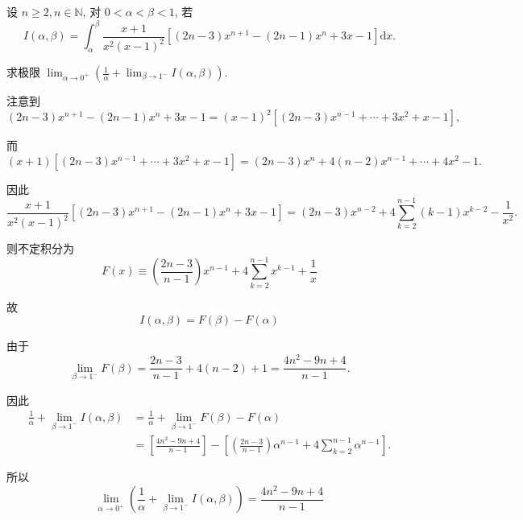 \begin{solution}
    设 $n \geq 2, n \in \mathbb{N}$, 对 $0<\alpha<\beta<1$, 若
    $$
        I(\alpha, \beta)=\int_\alpha^\beta \frac{x+1}{x^2(x-1)^2}\left[(2 n-3) x^{n+1}-(2 n-1) x^n+3 x-1\right] \mathrm{d} x .
    $$

    求极限 $\lim _{\alpha \rightarrow 0^{+}}\left(\frac{1}{\alpha}+\lim _{\beta \rightarrow 1^{-}} I(\alpha, \beta)\right)$.

    注意到
    $$
        (2 n-3) x^{n+1}-(2 n-1) x^n+3 x-1=(x-1)^2\left[(2 n-3) x^{n-1}+\cdots+3 x^2+x-1\right],
    $$

    而
    $$
        (x+1)\left[(2 n-3) x^{n-1}+\cdots+3 x^2+x-1\right]=(2 n-3) x^n+4(n-2) x^{n-1}+\cdots+4 x^2-1 .
    $$

    因此
    $$
        \frac{x+1}{x^2(x-1)^2}\left[(2 n-3) x^{n+1}-(2 n-1) x^n+3 x-1\right]=(2 n-3) x^{n-2}+4 \sum_{k=2}^{n-1}(k-1) x^{k-2}-\frac{1}{x^2} \text {. }
    $$

    则不定积分为
    $$
        F(x) \equiv\left(\frac{2 n-3}{n-1}\right) x^{n-1}+4 \sum_{k=2}^{n-1} x^{k-1}+\frac{1}{x}
    $$

    故
    $$
        I(\alpha, \beta)=F(\beta)-F(\alpha)
    $$

    由于
    $$
        \lim _{\beta \rightarrow 1^{-}} F(\beta)=\frac{2 n-3}{n-1}+4(n-2)+1=\frac{4 n^2-9 n+4}{n-1} .
    $$

    因此
    $$
        \begin{aligned}
            \frac{1}{\alpha}+\lim _{\beta \rightarrow 1^{-}} I(\alpha, \beta) & =\frac{1}{\alpha}+\lim _{\beta \rightarrow 1^{-}} F(\beta)-F(\alpha)                                                             \\
                                                                              & =\left[\frac{4 n^2-9 n+4}{n-1}\right]-\left[\left(\frac{2 n-3}{n-1}\right) \alpha^{n-1}+4 \sum_{k=2}^{n-1} \alpha^{n-1}\right] .
        \end{aligned}
    $$

    所以
    $$
        \lim _{\alpha \rightarrow 0^{+}}\left(\frac{1}{\alpha}+\lim _{\beta \rightarrow 1^{-}} I(\alpha, \beta)\right)=\frac{4 n^2-9 n+4}{n-1}
    $$
\end{solution}



